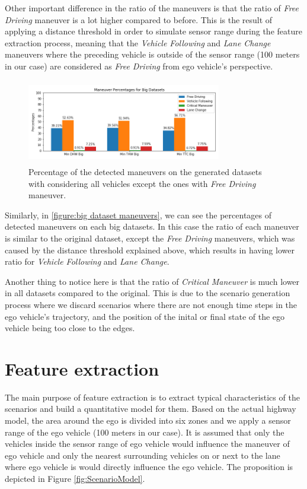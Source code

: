 \documentclass[conference]{IEEEtran}
\begin{document}
Other important difference in the ratio of the maneuvers is that the ratio of \textit{Free Driving} maneuver is a lot higher compared to before. This is the result of applying a distance threshold in order to simulate sensor range during the feature extraction process, meaning that the \textit{Vehicle Following} and \textit{Lane Change} maneuvers where the preceding vehicle is outside of the sensor range (100 meters in our case) are considered as \textit{Free Driving} from ego vehicle's perspective.

\begin{figure}[!h]
  \begin{center}
  	\includegraphics[width=8.5cm,height=3.7cm]{./images/big_datasets_maneuvers}
  \end{center}
  \caption{Percentage of the detected maneuvers on the generated datasets with considering all vehicles except the ones with \textit{Free Driving} maneuver.}
  \label{figure:big dataset maneuvers}
\end{figure}

Similarly, in \autoref{figure:big dataset maneuvers}, we can see the percentages of detected maneuvers on each big datasets. In this case the ratio of each maneuver is similar to the original dataset, except the \textit{Free Driving} maneuvers, which was caused by the distance threshold explained above, which results in having lower ratio for \textit{Vehicle Following} and \textit{Lane Change}.

Another thing to notice here is that the ratio of \textit{Critical Maneuver} is much lower in all datasets compared to the original. This is due to the scenario generation process where we discard scenarios where there are not enough time steps in the ego vehicle's trajectory, and the position of the inital or final state of the ego vehicle being too close to the edges.

\section{Feature extraction}
\label{section:feature extraction}
The main purpose of feature extraction is to extract typical characteristics of the scenarios and build a quantitative model for them. Based on the actual highway model, the area around the ego is divided into six zones and we apply a sensor range of the ego vehicle (100 meters in our case). It is assumed that only the vehicles inside the sensor range of ego vehicle would influence the maneuver of ego vehicle and only the nearest surrounding vehicles on or next to the lane where ego vehicle is would directly influence the ego vehicle. The proposition is depicted in Figure \ref{fig:ScenarioModel}.
\end{document}
